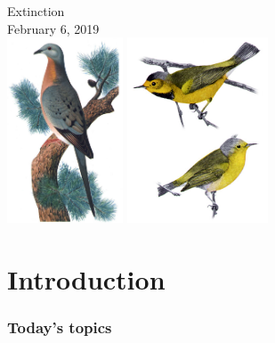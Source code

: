 \documentclass[color=usenames,dvipsnames]{beamer}\usepackage[]{graphicx}\usepackage[]{color}
\begin{document}
\begin{frame}[plain]
  \begin{center}
    {\Huge Extinction} \\
    {February 6, 2019} \\
    \vfill
    \includegraphics[height=5.5cm,keepaspectratio]{figs/passenger-pigeon} \hspace{0.5cm}
    \includegraphics[height=5.5cm,keepaspectratio]{figs/Vermivora_bachmanii} %
  \end{center}
\end{frame}




\section{Introduction}


\begin{frame}[plain]
  \frametitle{Today's topics}
  \tableofcontents%
\end{frame}
\end{document}
